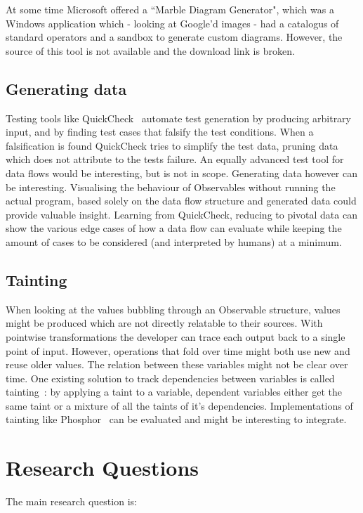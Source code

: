 \documentclass[11pt,a4paper]{article}
\begin{document}
At some time Microsoft offered a ``Marble Diagram Generator", which was a Windows application which - looking at Google'd images - had a catalogus of standard operators and a sandbox to generate custom diagrams. However, the source of this tool is not available and the download link is broken.

\subsection{Generating data}
Testing tools like QuickCheck~\cite{quickcheck} automate test generation by producing arbitrary input, and by finding test cases that falsify the test conditions. When a falsification is found QuickCheck tries to simplify the test data, pruning data which does not attribute to the tests failure. An equally advanced test tool for data flows would be interesting, but is not in scope. Generating data however can be interesting. Visualising the behaviour of Observables without running the actual program, based solely on the data flow structure and generated data could provide valuable insight. Learning from QuickCheck, reducing to pivotal data can show the various edge cases of how a data flow can evaluate while keeping the amount of cases to be considered (and interpreted by humans) at a minimum.

\subsection{Tainting}
When looking at the values bubbling through an Observable structure, values might be produced which are not directly relatable to their sources. With pointwise transformations the developer can trace each output back to a single point of input. However, operations that fold over time might both use new and reuse older values. The relation between these variables might not be clear over time. One existing solution to track dependencies between variables is called tainting~\cite{bell2015dynamic}: by applying a taint to a variable, dependent variables either get the same taint or a mixture of all the taints of it's dependencies. Implementations of tainting like Phosphor~\cite{bell2014phosphor} can be evaluated and might be interesting to integrate.

\section{Research Questions}
The main research question is:
\end{document}
